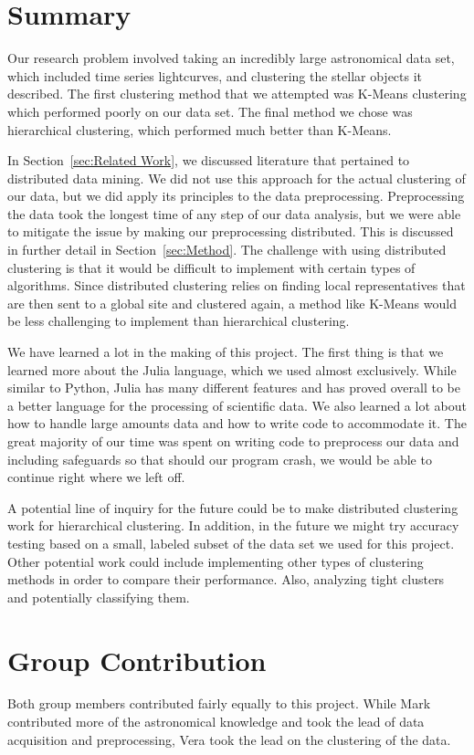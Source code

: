 \documentclass[12pt]{article}
\begin{document}
\section{Summary} %
\label{sec:Summary}
Our research problem involved taking an incredibly large astronomical data set, which included time series lightcurves, and clustering the stellar objects it described.
The first clustering method that we attempted was K-Means clustering which performed poorly on our data set.
The final method we chose was hierarchical clustering, which performed much better than K-Means.

In Section~\ref{sec:Related Work}, we discussed literature that pertained to distributed data mining.
We did not use this approach for the actual clustering of our data, but we did apply its principles to the data preprocessing.
Preprocessing the data took the longest time of any step of our data analysis, but we were able to mitigate the issue by making our preprocessing distributed.
This is discussed in further detail in Section~\ref{sec:Method}.
The challenge with using distributed clustering is that it would be difficult to implement with certain types of algorithms.
Since distributed clustering relies on finding local representatives that are then sent to a global site and clustered again, a method like K-Means would be less challenging to implement than hierarchical clustering.

We have learned a lot in the making of this project.
The first thing is that we learned more about the Julia language, which we used almost exclusively.
While similar to Python, Julia has many different features and has proved overall to be a better language for the processing of scientific data.
We also learned a lot about how to handle large amounts data and how to write code to accommodate it.
The great majority of our time was spent on writing code to preprocess our data and including safeguards so that should our program crash, we would be able to continue right where we left off.

A potential line of inquiry for the future could be to make distributed clustering work for hierarchical clustering.
In addition, in the future we might try accuracy testing based on a small, labeled subset of the data set we used for this project.
Other potential work could include implementing other types of clustering methods in order to compare their performance.
Also, analyzing tight clusters and potentially classifying them.



\newpage
\section{Group Contribution} %
\label{sec:Group Contribution}
Both group members contributed fairly equally to this project.
While Mark contributed more of the astronomical knowledge and took the lead of data acquisition and preprocessing, Vera took the lead on the clustering of the data.

\newpage


\end{document}
